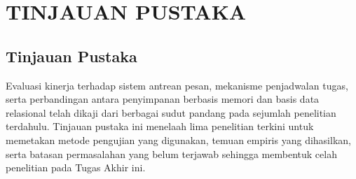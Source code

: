 \newpage
\chapter{TINJAUAN PUSTAKA} \label{Bab II}

\section{Tinjauan Pustaka} \label{II.Tinjauan}
Evaluasi kinerja terhadap sistem antrean pesan, mekanisme penjadwalan tugas, serta perbandingan antara penyimpanan berbasis memori dan basis data relasional telah dikaji dari berbagai sudut pandang pada sejumlah penelitian terdahulu. Tinjauan pustaka ini menelaah lima penelitian terkini untuk memetakan metode pengujian yang digunakan, temuan empiris yang dihasilkan, serta batasan permasalahan yang belum terjawab sehingga membentuk celah penelitian pada Tugas Akhir ini. \par

